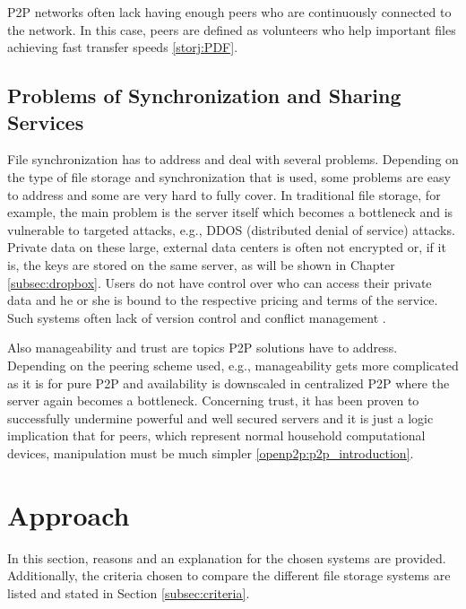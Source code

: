 P2P networks often lack having enough peers who are continuously connected to the network. In this case, peers are defined as volunteers who help important files achieving fast transfer speeds \ref{storj:PDF}.

\subsection{Problems of Synchronization and Sharing Services}
File synchronization has to address and deal with several problems. Depending on the type of file storage and synchronization that is used, some problems are easy to address and some are very hard to fully cover. In traditional file storage, for example, the main problem is the server itself which becomes a bottleneck and is vulnerable to targeted attacks, e.g., DDOS (distributed denial of service) attacks. Private data on these large, external data centers is often not encrypted or, if it is, the keys are stored on the same server, as will be shown in Chapter \ref{subsec:dropbox}. Users do not have control over who can access their private data and he or she is bound to the respective pricing and terms of the service. Such systems often lack of version control and conflict management \cite{hive2hive}.

Also manageability and trust are topics P2P solutions have to address. Depending on the peering scheme used, e.g., manageability gets more complicated as it is for pure P2P and availability is downscaled in centralized P2P where the server again becomes a bottleneck. Concerning trust, it has been proven to successfully undermine powerful and well secured servers and it is just a logic implication that for peers, which represent normal household computational devices, manipulation must be much simpler \ref{openp2p:p2p_introduction}.

\section{Approach}
\label{sec:approach}
In this section, reasons and an explanation for the chosen systems are provided. Additionally, the criteria chosen to compare the different file storage systems are listed and stated in Section \ref{subsec:criteria}.

